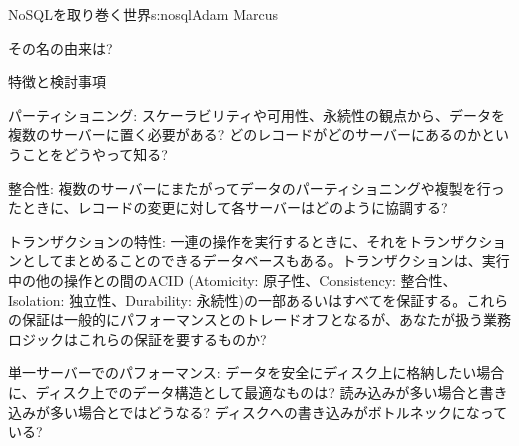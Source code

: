 \begin{aosachapter}{NoSQLを取り巻く世界}{s:nosql}{Adam Marcus}
\begin{aosasect1}{その名の由来は?}
\begin{aosasect2}{特徴と検討事項}
\begin{aosadescription}
  \item{パーティショニング}: スケーラビリティや可用性、永続性の観点から、データを複数のサーバーに置く必要がある? どのレコードがどのサーバーにあるのかということをどうやって知る?

  \item{整合性}: 複数のサーバーにまたがってデータのパーティショニングや複製を行ったときに、レコードの変更に対して各サーバーはどのように協調する?

  \item{トランザクションの特性}: 一連の操作を実行するときに、それをトランザクションとしてまとめることのできるデータベースもある。トランザクションは、実行中の他の操作との間のACID (Atomicity: 原子性、Consistency: 整合性、Isolation: 独立性、Durability: 永続性)の一部あるいはすべてを保証する。これらの保証は一般的にパフォーマンスとのトレードオフとなるが、あなたが扱う業務ロジックはこれらの保証を要するものか?

  \item{単一サーバーでのパフォーマンス}: データを安全にディスク上に格納したい場合に、ディスク上でのデータ構造として最適なものは? 読み込みが多い場合と書き込みが多い場合とではどうなる? ディスクへの書き込みがボトルネックになっている?


\end{aosadescription}
\end{aosasect2}
\end{aosasect1}
\end{aosachapter}
